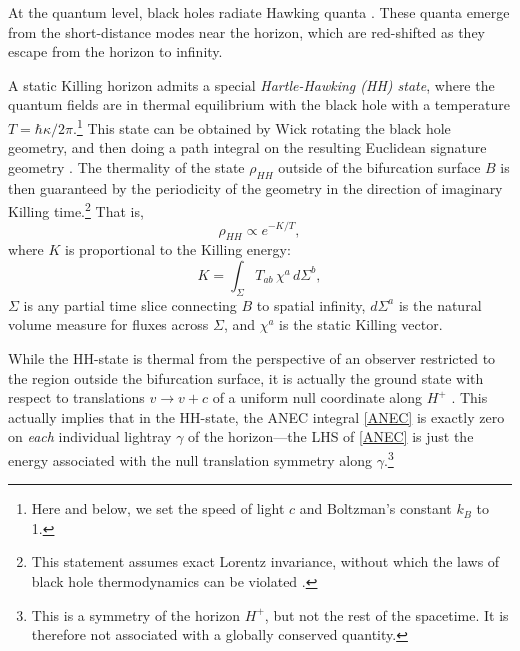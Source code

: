 \documentclass[12pt]{article}
\def\be{\begin{equation}}
\def\ee{\end{equation}}
\begin{document}
At the quantum level, black holes radiate Hawking quanta \cite{hawking1975particle}.  These quanta emerge from the short-distance modes near the horizon, which are red-shifted as they escape from the horizon to infinity.

A static Killing horizon admits a special \emph{Hartle-Hawking (HH) state}, where the quantum fields are in thermal equilibrium with the black hole with a temperature $T = \hbar \kappa / 2 \pi$.\footnote{Here and below, we set the speed of light $c$ and Boltzman's constant $k_B$ to 1.}  This state can be obtained by Wick rotating the black hole geometry, and then doing a path integral on the resulting Euclidean signature geometry \cite{hartle1976path,israel1976thermo}.  The thermality of the state $\rho_{HH}$ outside of the bifurcation surface $B$ is then guaranteed by the periodicity of the geometry in the direction of imaginary Killing time.\footnote{This statement assumes exact Lorentz invariance, without which the laws of black hole thermodynamics can be violated \cite{Dubovsky:2006vk,Eling:2007qd,Jacobson:2008yc}.}  That is,
\be\label{thermal}
\rho_{HH} \propto e^{-K / T},
\ee
where $K$ is proportional to the Killing energy:
\be\label{KillingK}
K = \int_\Sigma T_{ab}\,\chi^a\,d\Sigma^b,
\ee
$\Sigma$ is any partial time slice connecting $B$ to spatial infinity, $d\Sigma^a$ is the natural volume measure for fluxes across $\Sigma$, and $\chi^a$ is the static Killing vector.

While the HH-state is thermal from the perspective of an observer restricted to the region outside the bifurcation surface, it is actually the ground state with respect to translations $v \to v + c$ of a uniform null coordinate along $H^+$  \cite{israel1976thermo,fulling1977alternative,sewell,kay1991theorems}.  This actually implies that in the HH-state, the ANEC integral \eqref{ANEC} is exactly zero on \emph{each} individual lightray $\gamma$ of the horizon---the LHS of \eqref{ANEC} is just the energy associated with the null translation symmetry along $\gamma$.\footnote{This is a symmetry of the horizon $H^{+}$, but not the rest of the spacetime.  It is therefore not associated with a globally conserved quantity.}
\end{document}
